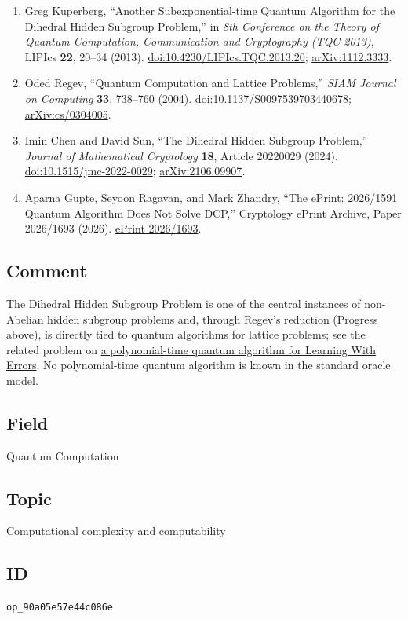 \begin{enumerate}[label={},leftmargin=4.8em,labelsep=0.5em]
  \footnotesize
  \item[\textup{[Kup13]}]\label{ref:90a0-kuperberg}
  Greg Kuperberg, ``Another Subexponential-time Quantum Algorithm for the
Dihedral Hidden Subgroup Problem,'' in \emph{8th Conference on the Theory of
Quantum Computation, Communication and Cryptography (TQC 2013)}, LIPIcs
\textbf{22}, 20--34 (2013).
\href{https://doi.org/10.4230/LIPIcs.TQC.2013.20}{doi:10.4230/LIPIcs.TQC.2013.20};
\href{https://arxiv.org/abs/1112.3333}{arXiv:1112.3333}.

  \item[\textup{[Reg04]}]\label{ref:90a0-regev}
  Oded Regev, ``Quantum Computation and Lattice Problems,'' \emph{SIAM
Journal on Computing} \textbf{33}, 738--760 (2004).
\href{https://doi.org/10.1137/S0097539703440678}{doi:10.1137/S0097539703440678};
\href{https://arxiv.org/abs/cs/0304005}{arXiv:cs/0304005}.

  \item[\textup{[CS24]}]\label{ref:90a0-chen-sun}
  Imin Chen and David Sun, ``The Dihedral Hidden Subgroup Problem,'' \emph{Journal
of Mathematical Cryptology} \textbf{18}, Article 20220029 (2024).
\href{https://doi.org/10.1515/jmc-2022-0029}{doi:10.1515/jmc-2022-0029};
\href{https://arxiv.org/abs/2106.09907}{arXiv:2106.09907}.

  \item[\textup{[GRZ26]}]\label{ref:90a0-grz}
  Aparna Gupte, Seyoon Ragavan, and Mark Zhandry, ``The ePrint:
2026/1591 Quantum Algorithm Does Not Solve DCP,'' Cryptology ePrint
Archive, Paper 2026/1693 (2026).
\href{https://eprint.iacr.org/2026/1693}{ePrint 2026/1693}.
\end{enumerate}

\subsection*{Comment}

The Dihedral Hidden Subgroup Problem is one of the central instances of
non-Abelian hidden subgroup problems and, through Regev's reduction (Progress
above), is directly tied to quantum algorithms for lattice problems; see the related problem on \href{https://qiqc-op.com/problem/op_3596f8c955c66d94/}{a polynomial-time quantum algorithm for Learning With Errors}.  No polynomial-time quantum algorithm is known
in the standard oracle model.

\subsection*{Field}

Quantum Computation

\subsection*{Topic}

Computational complexity and computability

\subsection*{ID}

\texttt{op\_90a05e57e44c086e}
